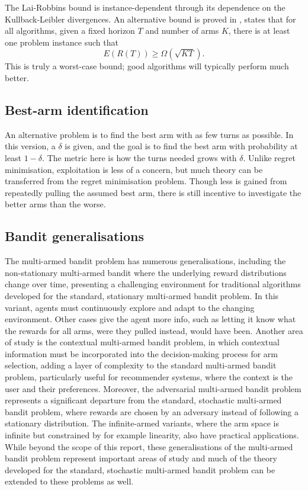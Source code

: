 The Lai-Robbins bound is instance-dependent through its dependence on the Kullback-Leibler divergences.
An alternative bound is proved in \cite{slivkins2019}, states that for all algorithms, given a fixed horizon $T$ and number of arms $K$, there is at least one problem instance such that
\begin{equation}
    E(R(T)) \geq \Omega(\sqrt{KT}).
\end{equation}
This is truly a worst-case bound; good algorithms will typically perform much better.

\subsection{Best-arm identification}
An alternative problem is to find the best arm with as few turns as possible.
In this version, a $\delta$ is given, and the goal is to find the best arm with probability at least $1-\delta$.
The metric here is how the turns needed grows with $\delta$.
Unlike regret minimisation, exploitation is less of a concern, but much theory can be transferred from the regret minimisation problem.
Though less is gained from repeatedly pulling the assumed best arm, there is still incentive to investigate the better arms than the worse.

\subsection{Bandit generalisations}
The multi-armed bandit problem has numerous generalisations, including the non-stationary multi-armed bandit where the underlying reward distributions change over time, presenting a challenging environment for traditional algorithms developed for the standard, stationary multi-armed bandit problem.
In this variant, agents must continuously explore and adapt to the changing environment.
Other cases give the agent more info, such as letting it know what the rewards for all arms, were they pulled instead, would have been.
Another area of study is the contextual multi-armed bandit problem, in which contextual information must be incorporated into the decision-making process for arm selection, adding a layer of complexity to the standard multi-armed bandit problem, particularly useful for recommender systems, where the context is the user and their preferences.
Moreover, the adversarial multi-armed bandit problem represents a significant departure from the standard, stochastic multi-armed bandit problem, where rewards are chosen by an adversary instead of following a stationary distribution.
The infinite-armed variants, where the arm space is infinite but constrained by for example linearity, also have practical applications.
While beyond the scope of this report, these generalisations of the multi-armed bandit problem represent important areas of study and much of the theory developed for the standard, stochastic multi-armed bandit problem can be extended to these problems as well\footnotemark.


